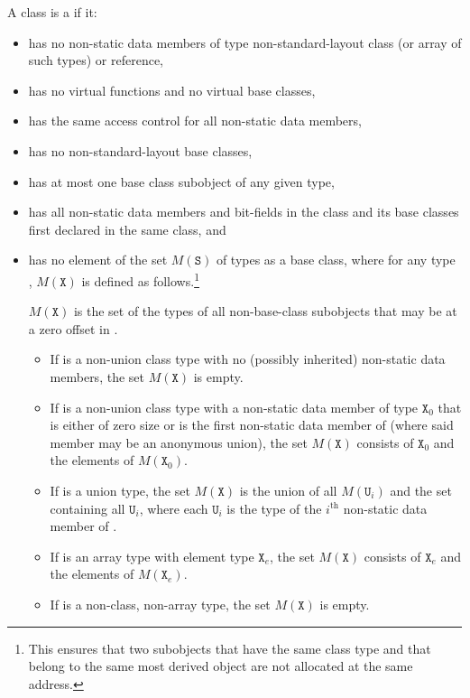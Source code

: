 \pnum
A class  is a  if it:
\begin{itemize}
\item has no non-static data members of type non-standard-layout class
(or array of such types) or reference,

\item has no virtual functions and no
virtual base classes,

\item has the same access control
for all non-static data members,

\item has no non-standard-layout base classes,

\item has at most one base class subobject of any given type,

\item has all non-static data members and bit-fields in the class and
its base classes first declared in the same class, and

\item has no element of the set $M(\mathtt{S})$ of types
as a base class,
where for any type , $M(\mathtt{X})$ is defined as follows.\footnote{
This ensures that two subobjects that have the same class type and that
belong to the same most derived object are not allocated at the same
address.}
\begin{note}
$M(\mathtt{X})$ is the set of the types of all non-base-class subobjects
that may be at a zero offset in .
\end{note}

\begin{itemize}
\item If  is a non-union class type with no (possibly
inherited) non-static data members, the set
$M(\mathtt{X})$ is empty.

\item If  is a non-union class type with a non-static data
member of type $\mathtt{X}_0$
that is either of zero size or
is the first non-static data member of 
(where said member may be an anonymous union),
the set $M(\mathtt{X})$ consists of $\mathtt{X}_0$ and the elements of
$M(\mathtt{X}_0)$.

\item If  is a union type, the set $M(\mathtt{X})$ is
the union of all $M(\mathtt{U}_i)$ and the set containing all $\mathtt{U}_i$,
where each $\mathtt{U}_i$ is the type of the $i^\text{th}$ non-static data member
of .

\item If  is an array type with element type $\mathtt{X}_e$,
the set $M(\mathtt{X})$ consists of $\mathtt{X}_e$
and the elements of $M(\mathtt{X}_e)$.

\item If  is a non-class, non-array type, the set $M(\mathtt{X})$ is empty.
\end{itemize}
\end{itemize}

